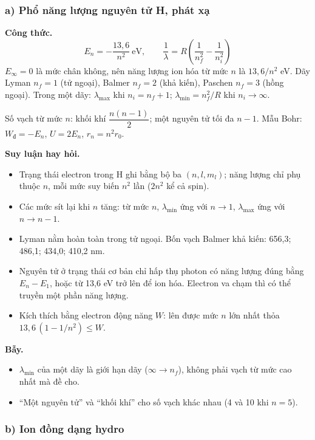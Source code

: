 \documentclass[11pt,a4paper]{article}
\newcommand{\Wd}{W_{\text{đ}}}
\begin{document}
\subsubsection*{a) Phổ năng lượng nguyên tử H, phát xạ}

\textbf{Công thức.}
\begin{equation*}
    E_n=-\frac{13{,}6}{n^2}\ \text{eV},\qquad \frac1\lambda=R\left(\frac1{n_f^2}-\frac1{n_i^2}\right)
\end{equation*}
$E_\infty=0$ là mức chân không, nên năng lượng ion hóa từ mức $n$ là $13{,}6/n^2$ eV. Dãy Lyman $n_f=1$ (tử ngoại), Balmer $n_f=2$ (khả kiến), Paschen $n_f=3$ (hồng ngoại). Trong một dãy: $\lambda_{\max}$ khi $n_i=n_f+1$; $\lambda_{\min}=n_f^2/R$ khi $n_i\to\infty$.

Số vạch từ mức $n$: khối khí $\dfrac{n(n-1)}{2}$; một nguyên tử tối đa $n-1$. Mẫu Bohr: $\Wd=-E_n$, $U=2E_n$, $r_n=n^2r_0$.

\textbf{Suy luận hay hỏi.}
\begin{itemize}
    \item Trạng thái electron trong H ghi bằng bộ ba $(n,l,m_l)$; năng lượng chỉ phụ thuộc $n$, mỗi mức suy biến $n^2$ lần ($2n^2$ kể cả spin).
    \item Các mức sít lại khi $n$ tăng: từ mức $n$, $\lambda_{\min}$ ứng với $n\to1$, $\lambda_{\max}$ ứng với $n\to n-1$.
    \item Lyman nằm hoàn toàn trong tử ngoại. Bốn vạch Balmer khả kiến: 656,3; 486,1; 434,0; 410,2 nm.
    \item Nguyên tử ở trạng thái cơ bản chỉ hấp thụ photon có năng lượng đúng bằng $E_n-E_1$, hoặc từ 13,6 eV trở lên để ion hóa. Electron va chạm thì có thể truyền một phần năng lượng.
    \item Kích thích bằng electron động năng $W$: lên được mức $n$ lớn nhất thỏa $13{,}6\,(1-1/n^2)\le W$.
\end{itemize}

\textbf{Bẫy.}
\begin{itemize}
    \item $\lambda_{\min}$ của một dãy là giới hạn dãy ($\infty\to n_f$), không phải vạch từ mức cao nhất mà đề cho.
    \item ``Một nguyên tử'' và ``khối khí'' cho số vạch khác nhau (4 và 10 khi $n=5$).
\end{itemize}

\subsubsection*{b) Ion đồng dạng hydro}
\end{document}
